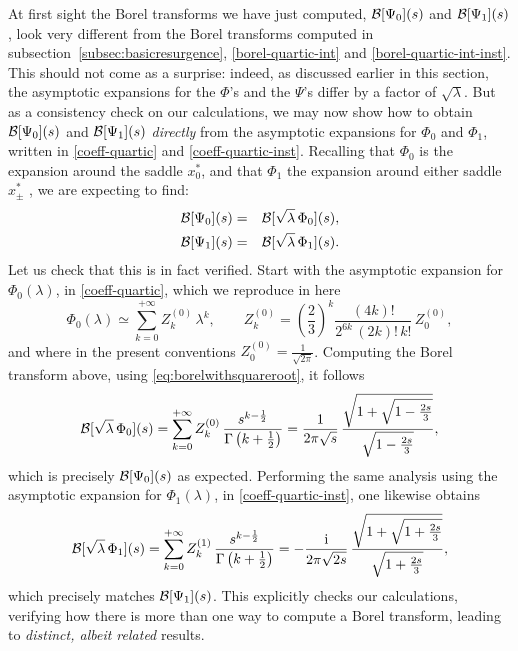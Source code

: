 \documentclass[11pt,a4paper]{article}
\newcommand{\CB}{{\cal B}}
\newcommand{\be}{\begin{equation}}
\newcommand{\ee}{\end{equation}}
\newcommand{\bea}{\begin{eqnarray}}
\newcommand{\eea}{\end{eqnarray}}
\newcommand{\rmi}{{\mathrm{i}}}
\begin{document}
At first sight the Borel transforms we have just computed, $\CB [\Psi_0] (s)$ and $\CB [\Psi_1] (s)$, look very different from the Borel transforms computed in subsection~\ref{subsec:basicresurgence}, \eqref{borel-quartic-int} and \eqref{borel-quartic-int-inst}. This should not come as a surprise: indeed, as discussed earlier in this section, the asymptotic expansions for the $\Phi$'s and the $\Psi$'s differ by a factor of $\sqrt{\lambda}$. But as a consistency check on our calculations, we may now show how to obtain $\CB [\Psi_0] (s)$ and $\CB [\Psi_1] (s)$ \textit{directly} from the asymptotic expansions for $\Phi_0$ and $\Phi_1$, written in \eqref{coeff-quartic} and \eqref{coeff-quartic-inst}. Recalling that $\Phi_0$ is the expansion around the saddle $x^*_0$, and that $\Phi_1$ the expansion around either saddle $x^*_{\pm}$ , we are expecting to find:
%
\bea
\CB[\Psi_0](s) &=& \CB[\sqrt{\lambda}\, \Phi_0](s), \\
\CB[\Psi_1](s) &=& \CB[\sqrt{\lambda}\, \Phi_1](s).
\eea
%
\noindent
Let us check that this is in fact verified. Start with the asymptotic expansion for $\Phi_0 (\lambda)$, in \eqref{coeff-quartic}, which we reproduce in here
%
\be
\Phi_{0} (\lambda) \simeq \sum_{k=0}^{+\infty} Z^{(0)}_k\, \lambda^k, \qquad Z^{(0)}_k = \left( \frac{2}{3} \right)^k \frac{(4k)!}{2^{6k}\, (2k)!\, k!}\, Z^{(0)}_0,
\ee
%
\noindent
and where in the present conventions $Z^{(0)}_0 = \frac{1}{\sqrt{2\pi}}$. Computing the Borel transform above, using \eqref{eq:borelwithsquareroot}, it follows
%
\be
\CB[\sqrt{\lambda}\, \Phi_0](s) = \sum_{k=0}^{+\infty} Z^{(0)}_k\, \frac{s^{k-\frac{1}{2}}}{\Gamma \left( k+\frac{1}{2} \right)} = \frac{1}{2\pi \sqrt{s}}\, \frac{\sqrt{1+\sqrt{1-\frac{2s}{3}}}}{\sqrt{1-\frac{2s}{3}}},
\ee
%
\noindent
which is precisely $\CB[\Psi_0](s)$ as expected. Performing the same analysis using the asymptotic expansion for $\Phi_1 (\lambda)$, in \eqref{coeff-quartic-inst}, one likewise obtains
%
\be
\CB[\sqrt{\lambda}\, \Phi_1](s) = \sum_{k=0}^{+\infty} Z^{(1)}_k\, \frac{s^{k-\frac{1}{2}}}{\Gamma \left( k+\frac{1}{2} \right)} = - \frac{\rmi}{2\pi \sqrt{2s}}\, \frac{\sqrt{1+\sqrt{1+\frac{2s}{3}}}}{\sqrt{1+\frac{2s}{3}}},
\ee
%
\noindent
which precisely matches $\CB[\Psi_1](s)$. This explicitly checks our calculations, verifying how there is more than one way to compute a Borel transform, leading to \textit{distinct, albeit related} results.
\end{document}
